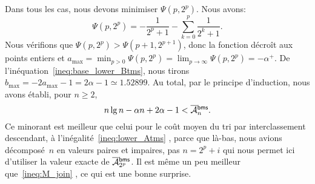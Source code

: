 Dans tous les cas, nous devons minimiser \(\Psi(p,2^p)\). Nous avons:
\begin{equation*}
  \Psi(p,2^p) = - \frac{1}{2^p+1} - \sum_{k=0}^{p}\frac{1}{2^k+1}.
\end{equation*}
Nous vérifions que \(\Psi(p,2^p) > \Psi(p+1,2^{p+1})\), donc la
fonction décroît aux points entiers et \(a_{\max} = \min_{p >
  0}\Psi(p,2^p) = \lim_{p \to \infty}\Psi(p,2^p) = -\alpha^{+}\). De
l'inéquation~\eqref{ineq:base_lower_Btms}, nous tirons \(b_{\max} =
-2a_{\max} - 1 = 2\alpha - 1 \simeq 1.52899\). Au total, par le
principe d'induction, nous avons établi, pour \(n \geqslant 2\),
\begin{equation*}
n\lg n - \alpha n + 2\alpha -1 < \OM{\fun{bms}}{n}.
\end{equation*}
Ce minorant est meilleur que celui pour le coût moyen du tri par
interclassement descendant, à l'inégalité~\eqref{ineq:lower_Atms}
, parce que là-bas, nous avions
décomposé~\(n\) en valeurs paires et impaires, pas \(n=2^p+i\) qui
nous permet ici d'utiliser la valeur exacte de
\(\OM{\fun{bms}}{2^p}\). Il est même un peu meilleur
que~\eqref{ineq:M_join} , ce qui est une bonne
surprise.

